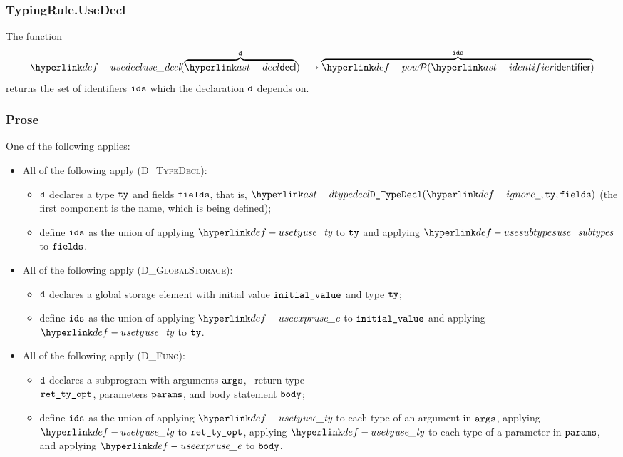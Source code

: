 \subsubsection{TypingRule.UseDecl \label{sec:TypingRule.UseDecl}}
\hypertarget{def-usedecl}{}
The function
\[
\usedecl(\overname{\decl}{\vd}) \aslto \overname{\pow{\identifier}}{\ids}
\]
returns the set of identifiers $\texttt{ids}$ which the declaration $\texttt{d}$ depends on.

\subsubsection{Prose}
One of the following applies:
\begin{itemize}
  \item All of the following apply (\textsc{D\_TypeDecl}):
  \begin{itemize}
    \item $\texttt{d}$ declares a type $\texttt{ty}$ and fields $\texttt{fields}$, that is,
          $\DTypeDecl(\Ignore, \tty, \fields)$ (the first component is the name, which is being defined);
    \item define $\texttt{ids}$ as the union of applying $\usety$ to $\texttt{ty}$ and applying $\usesubtypes$ to $\texttt{fields}$.
  \end{itemize}

  \item All of the following apply (\textsc{D\_GlobalStorage}):
  \begin{itemize}
    \item $\texttt{d}$ declares a global storage element with initial value $\texttt{initial\_value}$ and type $\texttt{ty}$;
    \item define $\texttt{ids}$ as the union of applying $\useexpr$ to $\texttt{initial\_value}$ and applying $\usety$ to $\texttt{ty}$.
  \end{itemize}

  \item All of the following apply (\textsc{D\_Func}):
  \begin{itemize}
    \item $\texttt{d}$ declares a subprogram with arguments $\texttt{args}$, \optional\ return type \\
          $\texttt{ret\_ty\_opt}$, parameters $\texttt{params}$, and body statement $\texttt{body}$;
    \item define $\texttt{ids}$ as the union of applying $\usety$ to each type of an argument in $\texttt{args}$,
          applying $\usety$ to $\texttt{ret\_ty\_opt}$, applying $\usety$ to each type of a parameter in $\texttt{params}$,
          and applying $\useexpr$ to $\texttt{body}$.
  \end{itemize}
\end{itemize}

